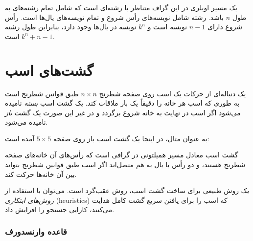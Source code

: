 یک مسیر اویلری در این گراف متناظر با رشته‌ای است
که شامل تمام رشته‌های به طول $n$ باشد.
رشته شامل نویسه‌های رأس شروع
و تمام نویسه‌های یال‌ها است.
رأس شروع دارای $n-1$ نویسه است
و $k^n$ نویسه در یال‌ها وجود دارد،
بنابراین طول رشته $k^n+n-1$ است.

\section{گشت‌های اسب}


یک  دنباله‌ای از حرکات
یک اسب روی صفحه شطرنج $n \times n$
طبق قوانین شطرنج است به طوری که اسب
هر خانه را دقیقاً یک بار ملاقات کند.
یک گشت اسب \emph{بسته} نامیده می‌شود
اگر اسب در نهایت به خانه شروع برگردد و
در غیر این صورت یک گشت \emph{باز} نامیده می‌شود.

به عنوان مثال، در اینجا یک گشت اسب باز روی صفحه $5 \times 5$ آمده است:

\begin{center}
\end{center}

گشت اسب معادل مسیر همیلتونی در گرافی است
که رأس‌های آن خانه‌های صفحه شطرنج هستند،
و دو رأس با یال به هم متصل‌اند اگر اسب
طبق قوانین شطرنج بتواند بین آن خانه‌ها حرکت کند.

یک روش طبیعی برای ساخت گشت اسب، روش عقب‌گرد است.
می‌توان با استفاده از \emph{روش‌های ابتکاری} (heuristics) که اسب را
برای یافتن سریع گشت کامل هدایت می‌کنند،
کارایی جستجو را افزایش داد.

\subsubsection{قاعده وارنسدورف}

